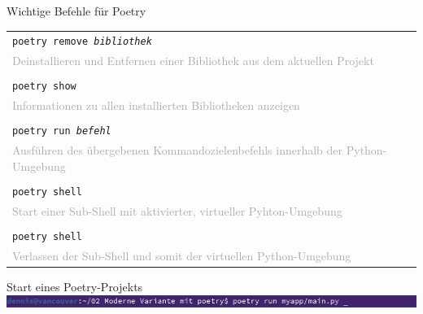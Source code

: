{{\begin{frame}[fragile]{Wichtige Befehle für Poetry}
{\begin{tabular}{|p{}|}
        \cellcolor{gray!15}
        \texttt{poetry remove \textit{bibliothek}} \\
        \cellcolor{gray!15}
        \textcolor{darkgray}{Deinstallieren und Entfernen einer Bibliothek aus dem aktuellen Projekt} \\

        \cellcolor{gray!7}
        \\

        \cellcolor{gray!15}
        \texttt{poetry show} \\
        \cellcolor{gray!15}
        \textcolor{darkgray}{Informationen zu allen installierten Bibliotheken anzeigen} \\

        \cellcolor{gray!7}
        \\

        \cellcolor{gray!15}
        \texttt{poetry run \textit{befehl}} \\
        \cellcolor{gray!15}
        \textcolor{darkgray}{Ausführen des übergebenen Kommandozielenbefehls innerhalb der Python-Umgebung} \\

        \cellcolor{gray!7}
        \\

        \cellcolor{gray!15}
        \texttt{poetry shell} \\
        \cellcolor{gray!15}
        \textcolor{darkgray}{Start einer Sub-Shell mit aktivierter, virtueller Pyhton-Umgebung} \\

        \cellcolor{gray!7}
        \\

        \cellcolor{gray!15}
        \texttt{poetry shell} \\
        \cellcolor{gray!15}
        \textcolor{darkgray}{Verlassen der Sub-Shell und somit der virtuellen Python-Umgebung} \\

        \hline
    \end{tabular}
    }
\end{frame}
}

{
\tiny

\begin{frame}[fragile]{Start eines Poetry-Projekts}
    \includegraphics[width=\textwidth]{img/poetry-run1}


\end{frame}}}
